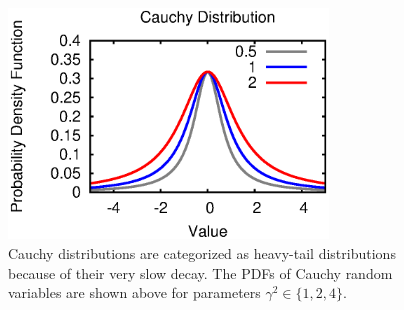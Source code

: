 \begin{figure}[ht]
\begin{center}
\includegraphics[width=8.5cm]{Figures/8chapter/cauchy_pdf}
\end{center}
\caption{Cauchy distributions are categorized as heavy-tail distributions because of their very slow decay.
The PDFs of Cauchy random variables are shown above for parameters $\gamma^2 \in \{ 1, 2, 4 \}$.}
\end{figure}

